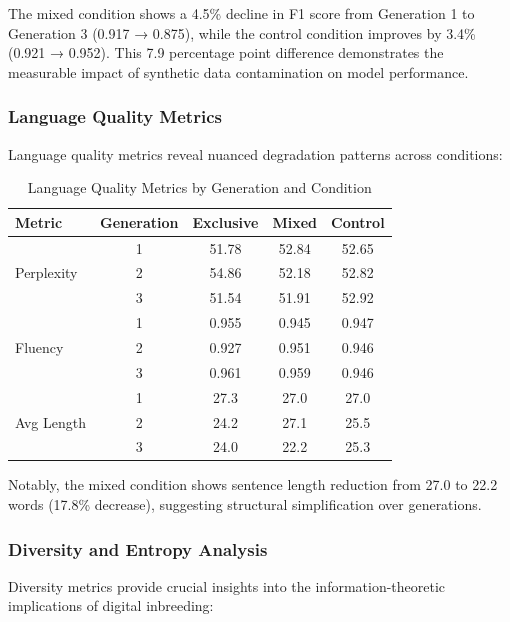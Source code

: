\documentclass{article}
\begin{document}
The mixed condition shows a 4.5\% decline in F1 score from Generation 1 to Generation 3 (0.917 → 0.875), while the control condition improves by 3.4\% (0.921 → 0.952). This 7.9 percentage point difference demonstrates the measurable impact of synthetic data contamination on model performance.

\subsubsection{Language Quality Metrics}

Language quality metrics reveal nuanced degradation patterns across conditions:

\begin{table}[h]
\centering
\caption{Language Quality Metrics by Generation and Condition}
\label{tab:language_quality}
\begin{tabular}{@{}lcccc@{}}
\toprule
Metric & Generation & Exclusive & Mixed & Control \\
\midrule
\multirow{3}{*}{Perplexity} & 1 & 51.78 & 52.84 & 52.65 \\
                            & 2 & 54.86 & 52.18 & 52.82 \\
                            & 3 & 51.54 & 51.91 & 52.92 \\
\midrule
\multirow{3}{*}{Fluency} & 1 & 0.955 & 0.945 & 0.947 \\
                         & 2 & 0.927 & 0.951 & 0.946 \\
                         & 3 & 0.961 & 0.959 & 0.946 \\
\midrule
\multirow{3}{*}{Avg Length} & 1 & 27.3 & 27.0 & 27.0 \\
                            & 2 & 24.2 & 27.1 & 25.5 \\
                            & 3 & 24.0 & 22.2 & 25.3 \\
\bottomrule
\end{tabular}
\end{table}

Notably, the mixed condition shows sentence length reduction from 27.0 to 22.2 words (17.8\% decrease), suggesting structural simplification over generations.

\subsubsection{Diversity and Entropy Analysis}

Diversity metrics provide crucial insights into the information-theoretic implications of digital inbreeding:
\end{document}
